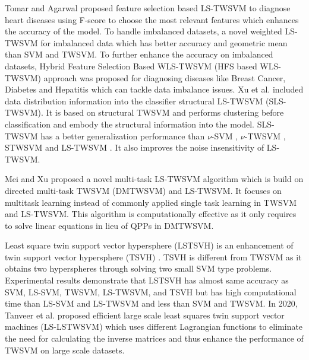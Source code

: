 \documentclass[pdflatex,sn-mathphys]{sn-jnl}%
\theoremstyle{thmstyleone}%
\theoremstyle{thmstyletwo}%
\theoremstyle{thmstylethree}%
\begin{document}
Tomar and Agarwal \cite{tomar2014feature} proposed feature selection based LS-TWSVM to diagnose heart diseases using F-score to choose the most relevant features which enhances the accuracy of the model. To handle imbalanced datasets,   a novel weighted LS-TWSVM \cite{tomar2014weighted} for imbalanced data which has better accuracy and geometric mean than SVM and TWSVM. To further enhance the accuracy on imbalanced datasets,  Hybrid Feature Selection Based WLS-TWSVM (HFS based WLS-TWSVM)  \cite{tomar2015hybrid} approach was proposed for diagnosing diseases like Breast Cancer, Diabetes and Hepatitis which can tackle data imbalance issues. Xu et al. \cite{xu2015structural} included data distribution information into the classifier structural LS-TWSVM (SLS-TWSVM). It is based on structural TWSVM and performs clustering before classification and embody the structural information into the model. SLS-TWSVM has a better generalization performance than $\nu$-SVM \cite{chen2005tutorial}, $\nu$-TWSVM \cite{peng2010nu}, STWSVM \cite{qi2013structural} and LS-TWSVM \cite{kumar2009least}. It also improves the noise insensitivity of LS-TWSVM.

Mei and Xu \cite{mei2019multi} proposed a novel multi-task LS-TWSVM algorithm which is build on directed multi-task TWSVM (DMTWSVM) and LS-TWSVM. It focuses on multitask learning instead of commonly applied single task learning in TWSVM and LS-TWSVM. This algorithm is computationally effective as it only requires to solve linear equations in lieu of QPPs in DMTWSVM.

Least square twin support vector hypersphere (LSTSVH)  \cite{tomar2015hybrid} is an enhancement of twin support vector hypersphere (TSVH) \cite{peng2013twin}. TSVH is different from TWSVM as it obtains two hyperspheres through solving two small SVM type problems. Experimental results demonstrate that LSTSVH has almost same accuracy as SVM, LS-SVM, TWSVM, LS-TWSVM, and TSVH but has high computational time than LS-SVM and LS-TWSVM and less than SVM and TWSVM. In 2020, Tanveer et al. \cite{tanveer2020largescale} proposed efficient large scale least squares twin support vector machines (LS-LSTWSVM) which uses different Lagrangian functions to eliminate the need for calculating the inverse matrices and thus enhance the performance of TWSVM on large scale datasets. 
\end{document}
